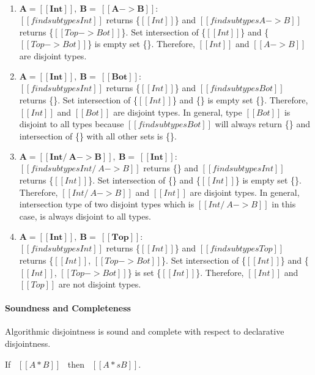 \begin{enumerate}
  \item $\boldsymbol{A = [[Int]], \ B = \ [[A -> B]]:}$ \\
        $[[findsubtypes Int]]$ returns \{$[[Int]]$\} and $[[findsubtypes A -> B]]$ returns
        \{$[[Top -> Bot]]$\}. Set intersection of \{$[[Int]]$\} and \{$[[Top -> Bot]]$\} is
        empty set \{\}. Therefore, $[[Int]]$ and $[[A -> B]]$ are disjoint types.
  \item $\boldsymbol{A = [[Int]], \ B = \ [[Bot]]:}$ \\
        $[[findsubtypes Int]]$ returns \{$[[Int]]$\} and $[[findsubtypes Bot]]$ returns
        \{\}. Set intersection of \{$[[Int]]$\} and \{\} is
        empty set \{\}. Therefore, $[[Int]]$ and $[[Bot]]$ are disjoint types.
        In general, type $[[Bot]]$ is disjoint to all types because $[[findsubtypes Bot]]$
        will always return \{\} and intersection of \{\} with all other sets is \{\}.
  \item $\boldsymbol{A = [[Int /\ A -> B]], \ B = \ [[Int]]:}$ \\
        $[[findsubtypes Int /\ A -> B]]$ returns \{\} and $[[findsubtypes Int]]$ returns
        \{$[[Int]]$\}. Set intersection of \{\} and \{$[[Int]]$\} is
        empty set \{\}. Therefore, $[[Int /\ A -> B]]$ and $[[Int]]$ are disjoint types.
        In general, intersection type of two disjoint types which is $[[Int /\ A -> B]]$ in this case,
        is always disjoint to all types.
  \item $\boldsymbol{A = [[Int]], \ B = \ [[Top]]:}$ \\
        $[[findsubtypes Int]]$ returns \{$[[Int]]$\} and $[[findsubtypes Top]]$ returns
        \{$[[Int]]$, $[[Top -> Bot]]$\}.
        Set intersection of \{$[[Int]]$\} and \{$[[Int]]$, $[[Top -> Bot]]$\} is
        set \{$[[Int]]$\}. Therefore, $[[Int]]$ and $[[Top]]$ are not disjoint types.
\end{enumerate}

\paragraph{Soundness and Completeness}
Algorithmic disjointness is sound and complete with respect to declarative disjointness.

\begin{lemma}
  If \ $[[A * B]]$ \ then \ $[[A *s B]]$.
\label{lemma:inter:disj-sound}
\end{lemma}


